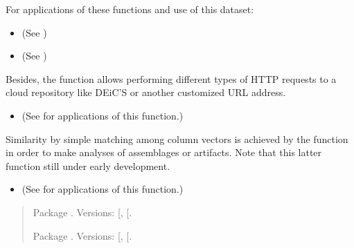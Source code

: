 \documentclass[a4paper,12pt,english]{sphinxhowto}
\begin{document}
For applications of these functions and use of this dataset:
\begin{itemize}
\item {} 
(See {\hyperref[\detokenize{Epigraphic:edh}]{}})

\item {} 
(See {\hyperref[\detokenize{EpigraphicNetwork:edh-net}]{}})

\end{itemize}


Besides, the  function allows performing different types of HTTP requests to a cloud
repository like DEiC’S  or another customized URL address.
\begin{itemize}
\item {} 
(See {\hyperref[\detokenize{Sciencedata_dk:deic-sddk}]{}} for applications of this function.)

\end{itemize}


Similarity by simple matching among column vectors is achieved by the  function in order
to make analyses of assemblages or artifacts. Note that this latter function still under early
development.
\begin{itemize}
\item {} 
(See {\hyperref[\detokenize{EpigraphicNetwork:edh-net}]{}} for applications of this function.)

\end{itemize}

\begin{quote}




Package . Versions:
{[}\sphinxhref{https://CRAN.R-project.org/package=multigraph}{CRAN}{]},
{[}\sphinxhref{https://github.com/mplex/multigraph}{GitHub}{]}.

Package . Versions:
{[}\sphinxhref{https://CRAN.R-project.org/package=multiplex}{CRAN}{]},
{[}\sphinxhref{https://github.com/mplex/multiplex}{GitHub}{]}.


\end{quote}
\end{document}
